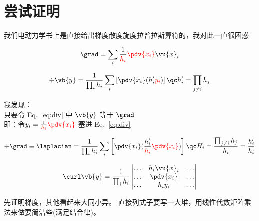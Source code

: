 
\section{尝试证明}%
我们电动力学书上是直接给出梯度散度旋度拉普拉斯算符的，我对此一直很困惑

\begin{definition}[梯度]
	\begin{equation}
		\grad = \sum_i \frac{1}{\textcolor{red}{h_i}} \red{\pdv{x_i}} \vu{x}_i
		\label{eq:梯度}
	\end{equation}
\end{definition}

\begin{definition}[散度]
	\begin{equation}
		\label{eq:div}
		\div \vb{y}  = \frac{1}{\prod_i h_i} \sum_i \left[
			\pdv{x_i}( h'_i \red{y_i})
			\right]
		\qc
		h'_{i} = \prod_{j \neq i}  h_j
	\end{equation}
\end{definition}

我发现：\\
只要令 Eq.~\eqref{eq:div} 中 $\vb{y}$ 等于 $\grad$ \\
即：令$y_i=\frac{1}{\textcolor{red}{h_i}} \red{\pdv{x_i}} $ 塞进 Eq.~\eqref{eq:div}
\begin{definition}[拉普拉斯算子]

	\begin{equation}
		\div \grad \equiv \laplacian = \frac{1}{\prod_i h_i}
		\sum_i
		\left[
			\pdv{x_i}( \frac{h'_i}{\red{h_i}} \red{\pdv{x_i}})
			\right]
		\qc
		H_i = \frac{\prod_{j \neq i} h_j}{ h_i } =\frac{h'_i}{ h_i }
	\end{equation}
\end{definition}


\begin{definition}[旋度]
	\begin{equation}
		\curl \vb{y}  = \frac{1}{\prod_i h_i}
		\begin{vmatrix}
			\ldots & h_i  \vu{x}_i & \ldots \\
			\ldots & \pdv{x_i}     & \ldots \\
			\ldots & h_i y_i       & \ldots
		\end{vmatrix}
	\end{equation}
\end{definition}
先证明梯度，其他看起来大同小异。
直接列式子要写一大堆，用线性代数矩阵乘法来做要简洁些(满足结合律)。
